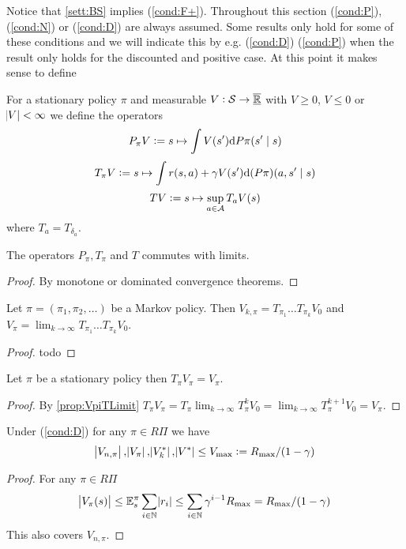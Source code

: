 Notice that \cref{sett:BS} implies (\cref{cond:F+}).
Throughout this section (\cref{cond:P}), (\cref{cond:N}) or (\cref{cond:D})
are always assumed. Some results only hold for some of these conditions
and we will indicate this by e.g. (\cref{cond:D}) (\cref{cond:P}) when
the result only holds for the discounted and positive case.
At this point it makes sense to define

\begin{defn}
  For a stationary policy $\pi$ and measurable $V:\mathcal{S} \to \overline{\underline{\mathbb{R}}}$
  with $V \geq 0$, $V \leq 0$ or $\abs{V} < \infty$
  we define the operators 
  \[ P_\pi V \vcentcolon= s \mapsto \int V(s') \mathrm{d} P\pi(s' \mid s) \]
  \[ T_\pi V \vcentcolon= s \mapsto \int r(s, a)
  + \gamma V(s') \mathrm{d} (P \pi)(a, s'\mid s) \]
  \[ T V \vcentcolon= s \mapsto \sup_{a \in \mathcal{A}} T_a V(s) \]
  where $T_a = T_{\delta_a}$.
\end{defn}

\begin{prop}
  The operators $P_\pi, T_\pi$ and $T$ commutes with limits.
\end{prop}
\begin{proof}
  By monotone or dominated convergence theorems.
\end{proof}

\begin{prop} Let $\pi = (\pi_1, \pi_2, \dots)$ be a Markov policy. Then
  $V_{k, \pi} = T_{\pi_1} \dots T_{\pi_k} V_0$ and
  $V_\pi = \lim_{k \to \infty} T_{\pi_1} \dots T_{\pi_k} V_0$.
  \label{prop:VpiTLimit}
\end{prop}
\begin{proof}
  todo
\end{proof}

\begin{prop} Let $\pi$ be a stationary policy then
  $T_\pi V_\pi = V_\pi$.
  \label{prop:VpiFP}
\end{prop}
\begin{proof}
  By \cref{prop:VpiTLimit}
  $T_\pi V_\pi = T_\pi \lim_{k \to\infty} T_{\pi}^k V_0
  = \lim_{k \to\infty} T_\pi^{k+1} V_0 = V_\pi$.
\end{proof}

\begin{prop}
  Under (\cref{cond:D}) for any $\pi \in R\Pi$ we have
  \[ \abs{V_{n,\pi}}, \abs{V_\pi}, \abs{V^*_k}, \abs{V^*}
  \leq V_{\max} \vcentcolon= R_{\max}/(1-\gamma) \]
  \label{prop:Vbounded}
\end{prop}
\begin{proof}
  For any $\pi \in R\Pi$
  \[ \abs{V_\pi(s)} \leq \mathbb{E}_s^\pi \sum_{i \in \mathbb{N}} \abs{r_i}
    \leq \sum_{i \in \mathbb{N}} \gamma^{i-1} R_{\max}
  = R_{\max} / (1-\gamma) \]
  This also covers $V_{n, \pi}$.
\end{proof}

